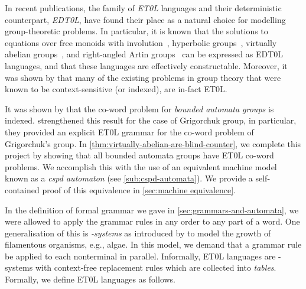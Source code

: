 In recent publications, the family of \emph{ET0L} languages and their deterministic counterpart, \emph{EDT0L}, have found their place as a natural choice for modelling group-theoretic problems.
In particular, it is known that the solutions to equations over free monoids with involution~\cite{diekert2017}, hyperbolic groups~\cite{ciobanu2019}, virtually abelian groups~\cite{evetts2020}, and right-angled Artin groups~\cite{diekert2001} can be expressed as EDT0L languages, and that these languages are effectively constructable.
Moreover, it was shown by \textcite{ciobanu2018} that many of the existing problems in group theory that were known to be context-sensitive (or indexed), are in-fact ET0L.

It was shown by \textcite{holt2006} that the co-word problem for \emph{bounded automata groups} is indexed.
\Textcite{ciobanu2018} strengthened this result for the case of Grigorchuk group, in particular, they provided an explicit ET0L grammar for the co-word problem of Grigorchuk's group.
In \cref{thm:virtually-abelian-are-blind-counter}, we complete this project by showing that all bounded automata groups have ET0L co-word problems.
We accomplish this with the use of an equivalent machine model known as a \emph{cspd automaton} (see \cref{sub:cspd-automata}).
We provide a self-contained proof of this equivalence in \cref{sec:machine equivalence}.

In the definition of formal grammar we gave in \cref{sec:grammars-and-automata}, we were allowed to apply the grammar rules in any order to any part of a word.
One generalisation of this is \emph{\citeauthor{lindenmayer1968}-systems} as introduced by \textcite{lindenmayer1968} to model the growth of filamentous organisms, e.g., algae.
In this model, we demand that a grammar rule be applied to each nonterminal in parallel.
Informally, ET0L languages are \citeauthor{lindenmayer1968}-systems with context-free replacement rules which are collected into \emph{tables}.
Formally, we define ET0L languages as follows.

